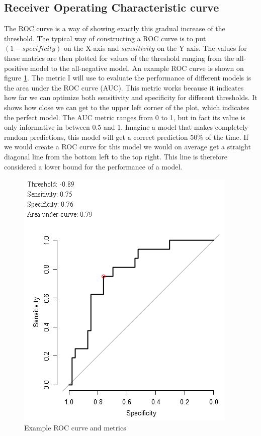 \subsection{Receiver Operating Characteristic curve}
The ROC curve is a way of showing exactly this gradual increase of the threshold. The typical way of constructing a ROC curve is to put $(1-specificity)$ on the X-axis and $sensitivity$ on the Y axis. The values for these matrics are then plotted for values of the threshold ranging from the all-positive model to the all-negative model. An example ROC curve is shown on figure \ref{fig:evaluation-roc}. The metric I will use to evaluate the performance of different models is the area under the ROC curve (AUC). This metric works because it indicates how far we can optimize both sensitivity and specificity for different thresholds. It shows how close we can get to the upper left corner of the plot, which indicates the perfect model. The AUC metric ranges from 0 to 1, but in fact its value is only informative in between 0.5 and 1. Imagine a model that makes completely random predictions, this model will get a correct prediction 50\% of the time. If we would create a ROC curve for this model we would on average get a straight diagonal line from the bottom left to the top right. This line is therefore considered a lower bound for the performance of a model.
\begin{figure}
	\centering
	\includegraphics[scale=.9]{images/roc_curve}
	\caption{Example ROC curve and metrics}
	\label{fig:evaluation-roc}
\end{figure}
